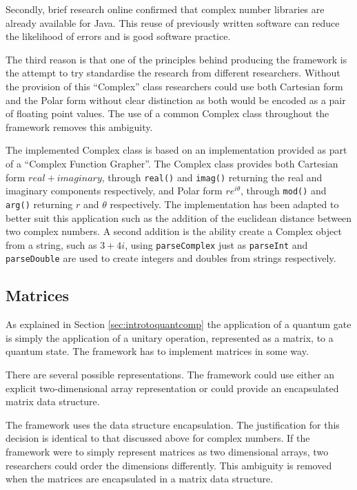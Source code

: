 Secondly, brief research online confirmed that complex number libraries are already available for Java.
This reuse of previously written software can reduce the likelihood of errors and is good software practice.

The third reason is that one of the principles behind producing the framework is the attempt to try standardise the research from different researchers.
Without the provision of this ``Complex'' class researchers could use both Cartesian form and the Polar form without clear distinction as both would be encoded as a pair of floating point values.
The use of a common Complex class throughout the framework removes this ambiguity.

The implemented Complex class is based on an implementation provided as part of a ``Complex Function Grapher''\cite{compimp}.
The Complex class provides both Cartesian form $real + imaginary$, through \lstinline{real()} and \lstinline{imag()} returning the real and imaginary components respectively, and Polar form $re^{i\theta}$, through \lstinline{mod()} and \lstinline{arg()} returning $r$ and $\theta$ respectively.
The implementation has been adapted to better suit this application such as the addition of the euclidean distance between two complex numbers.
A second addition is the ability create a Complex object from a string, such as $3+4i$, using \lstinline{parseComplex} just as \lstinline{parseInt} and \lstinline{parseDouble} are used to create integers and doubles from strings respectively.

\subsection{Matrices}
As explained in Section \ref{sec:introtoquantcomp} the application of a quantum gate is simply the application of a unitary operation, represented as a matrix, to a quantum state.
The framework has to implement matrices in some way.

There are several possible representations.
The framework could use either an explicit two-dimensional array representation or could provide an encapsulated matrix data structure.

The framework uses the data structure encapsulation.
The justification for this decision is identical to that discussed above for complex numbers.
If the framework were to simply represent matrices as two dimensional arrays, two researchers could order the dimensions differently.
This ambiguity is removed when the matrices are encapsulated in a matrix data structure.

